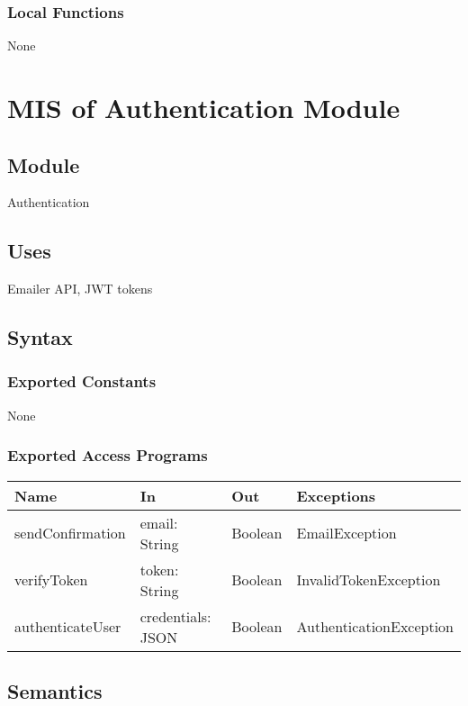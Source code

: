 \documentclass[12pt, titlepage]{article}
\begin{document}
\subsubsection{Local Functions}
None

\section{MIS of Authentication Module} \label{AuthenticationModule}

\subsection{Module}
Authentication

\subsection{Uses}
Emailer API, JWT tokens

\subsection{Syntax}

\subsubsection{Exported Constants}
None

\subsubsection{Exported Access Programs}
\begin{center}
\begin{tabular}{p{2cm} p{4cm} p{4cm} p{2cm}}
\hline
\textbf{Name} & \textbf{In} & \textbf{Out} & \textbf{Exceptions} \\
\hline
sendConfirmation & email: String & Boolean & EmailException \\
verifyToken & token: String & Boolean & InvalidTokenException \\
authenticateUser & credentials: JSON & Boolean & AuthenticationException \\
\hline
\end{tabular}
\end{center}

\subsection{Semantics}
\end{document}
